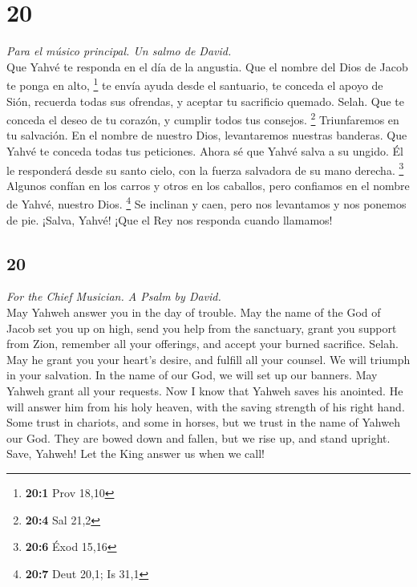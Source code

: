 \begin{paracol}{2}
\hypertarget{section-38}{%
\section{20}\label{section-38}}

\emph{Para el músico principal. Un salmo de David.}\\
 Que Yahvé te responda en el día de la angustia. Que el
nombre del Dios de Jacob te ponga en alto, \footnote{\textbf{20:1} Prov
  18,10}  te envía ayuda desde el santuario, te conceda el
apoyo de Sión,  recuerda todas sus ofrendas, y aceptar tu
sacrificio quemado. Selah.  Que te conceda el deseo de tu
corazón, y cumplir todos tus consejos. \footnote{\textbf{20:4} Sal 21,2}
 Triunfaremos en tu salvación. En el nombre de nuestro
Dios, levantaremos nuestras banderas. Que Yahvé te conceda todas tus
peticiones.  Ahora sé que Yahvé salva a su ungido. Él le
responderá desde su santo cielo, con la fuerza salvadora de su mano
derecha. \footnote{\textbf{20:6} Éxod 15,16}  Algunos
confían en los carros y otros en los caballos, pero confiamos en el
nombre de Yahvé, nuestro Dios. \footnote{\textbf{20:7} Deut 20,1; Is
  31,1}  Se inclinan y caen, pero nos levantamos y nos
ponemos de pie.  ¡Salva, Yahvé! ¡Que el Rey nos responda
cuando llamamos!

\switchcolumn
\begin{otherlanguage}{english}

\hypertarget{section-39}{%
\section{20}\label{section-39}}

\emph{For the Chief Musician. A Psalm by David.}\\
 May Yahweh answer you in the day of trouble. May the name
of the God of Jacob set you up on high,  send you help
from the sanctuary, grant you support from Zion,  remember
all your offerings, and accept your burned sacrifice. Selah.
 May he grant you your heart's desire, and fulfill all
your counsel.  We will triumph in your salvation. In the
name of our God, we will set up our banners. May Yahweh grant all your
requests.  Now I know that Yahweh saves his anointed. He
will answer him from his holy heaven, with the saving strength of his
right hand.  Some trust in chariots, and some in horses,
but we trust in the name of Yahweh our God.  They are
bowed down and fallen, but we rise up, and stand upright. 
Save, Yahweh! Let the King answer us when we call!


\end{otherlanguage}
\end{paracol}
